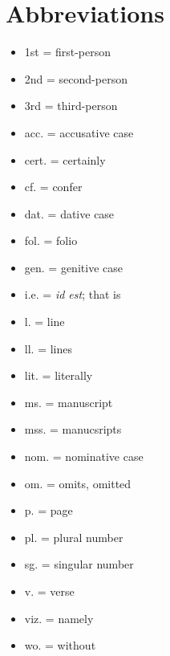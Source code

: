 \section{Abbreviations}
  \begin{itemize}
    \item 1st = first-person
    \item 2nd = second-person
    \item 3rd = third-person
    \item acc. = accusative case
    \item cert. = certainly
    \item cf. = confer
    \item dat. = dative case
    \item fol. = folio
    \item gen. = genitive case
    \item i.e. = \emph{id est}; that is
    \item l. = line
    \item ll. = lines
    \item lit. = literally
    \item ms. = manuscript
    \item mss. = manucsripts
    \item nom. = nominative case
    \item om. = omits, omitted
    \item p. = page
    \item pl. = plural number
    \item sg. = singular number
    \item v. = verse
    \item viz. = namely
    \item wo. = without
  \end{itemize}

